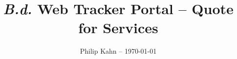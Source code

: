 \documentclass{amsart}
\begin{document}
\title{\textit{B.d.} Web Tracker Portal -- Quote for Services}
\author{Philip Kahn -- \today}

\maketitle
\end{document}
